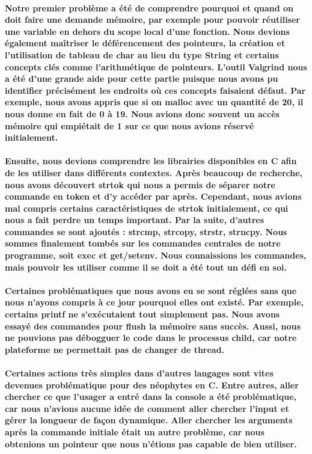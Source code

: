 \documentclass{article}
\begin{document}
\paragraph{Notre premier problème a été de comprendre pourquoi et quand on doit faire une demande mémoire, par exemple pour pouvoir  réutiliser une variable en dehors du scope local d’une fonction. Nous devions également maîtriser le déférencement des pointeurs, la création et l’utilisation de tableau de char au lieu du type String et certains concepts clés comme l’arithmétique de pointeurs. L’outil Valgrind nous a été d’une grande aide pour cette partie puisque nous avons pu identifier précisément les endroits où ces concepts faisaient défaut. Par exemple, nous avons appris que si on malloc avec un quantité de 20, il nous donne en fait de 0 à 19. Nous avions donc souvent un accès mémoire qui empiétait de 1 sur ce que nous avions réservé initialement.}

\paragraph{Ensuite, nous devions comprendre les librairies disponibles en C afin de les utiliser dans différents contextes. Après beaucoup de recherche, nous avons découvert strtok qui nous a permis de séparer notre commande en token et d’y accéder par après. Cependant, nous avions mal compris certains caractéristiques de strtok initialement, ce qui nous a fait perdre un temps important. Par la suite, d’autres commandes se sont ajoutés : strcmp, strcopy, strstr, strncpy. Nous sommes finalement tombés sur les commandes centrales de notre programme, soit exec et get/setenv. Nous connaissions les commandes, mais pouvoir les utiliser comme il se doit a été tout un défi en soi.}

\paragraph{Certaines problématiques que nous avons eu se sont réglées sans que nous n’ayons compris à ce jour pourquoi elles ont existé. Par exemple, certains printf ne s’exécutaient tout simplement pas. Nous avons essayé des commandes pour flush la mémoire sans succès. Aussi, nous ne pouvions pas débogguer le code dans le processus child, car notre plateforme ne permettait pas de changer de thread. }

\paragraph{Certaines actions très simples dans d’autres langages sont vites devenues problématique pour des néophytes en C. Entre autres, aller chercher ce que l’usager a entré dans la console a été problématique, car nous n’avions aucune idée de comment aller chercher l’input et gérer la longueur de façon dynamique. Aller chercher les arguments après la commande initiale était un autre problème, car  nous obtenions  un pointeur que nous n’étions pas capable de bien utiliser.}
\end{document}
